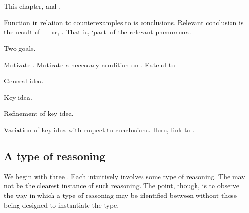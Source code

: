 \chapter{}
\label{cha:typical}

\begin{note}
  This chapter, \tR{} and \tC{}.

  Function in relation to counterexamples to \issueConstraint{} is conclusions.
  Relevant conclusion is the result of \tR{} --- or, \tR[concluding]{}.
  That is, `part' of the relevant phenomena.

  Two goals.

  Motivate \tR{}.
  Motivate a necessary condition on \tR{}.
  Extend to \tC{}.
\end{note}

\begin{note}
  \begin{TOCEnum}
  \item

    General idea.
  \item

    Key idea.
  \item

    Refinement of key idea.
  \item

    Variation of key idea with respect to conclusions.
    Here, link \tR{} to .
  \end{TOCEnum}
\end{note}

\section{A type of reasoning}
\label{cha:typical:sec:g-s}

\begin{note}
  We begin with three .
  Each  intuitively involves some type of reasoning.
  The  may not be the clearest instance of such reasoning.
  The point, though, is to observe the way in which a type of reasoning may be identified between  without those  being designed to instantiate the type.
\end{note}

